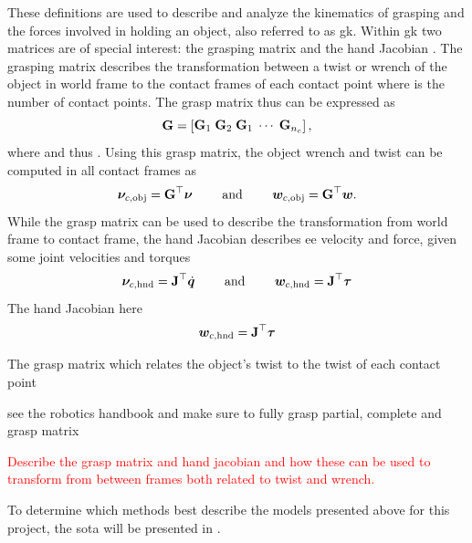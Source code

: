 These definitions are used to describe and analyze the kinematics of grasping and the forces involved in holding an object, also referred to as \gls{gk}. Within \gls{gk} two matrices are of special interest: the grasping matrix  and the hand Jacobian . The grasping matrix describes the transformation between a twist or wrench of the object in world frame  to the contact frames of each contact point  where  is the number of contact points. The grasp matrix thus can be expressed as
\begin{equation}
	\mat{G} = \rvec{ \mat{G}_1 \vsep \mat{G}_2 \vsep \mat{G}_1 \vsep \cdots \vsep \mat{G}_{n_c}},
	\label{eq:grasp-matrix-def}
\end{equation}
where  and thus . Using this grasp matrix, the object wrench and twist can be computed in all contact frames as
%
\begin{equation}
	\bm{\nu}_{c,\text{obj}} =  \bm{\mathrm{G}}^\top \bm{\nu} \qquad \text{ and } \qquad \bm{w}_{c,\text{obj}} =  \bm{\mathrm{G}}^\top \bm{w}.
	\label{eq:grasp-matrix-twist}
\end{equation}
%
While the grasp matrix can be used to describe the transformation from world frame to contact frame, the hand Jacobian describes \gls{ee} velocity and force, given some joint velocities and torques
% 
\begin{equation}
	\bm{\nu}_{c,\text{hnd}} = \bm{\mathrm{J}}^\top \dot{\bm{q}} \qquad \text{ and } \qquad \bm{w}_{c,\text{hnd}} = \bm{\mathrm{J}}^\top \bm{\tau}
	\label{eq:hand-jacobian-velocity}
\end{equation}
%
The hand Jacobian here 
\begin{equation}
	\bm{w}_{c,\text{hnd}} = \bm{\mathrm{J}}^\top \bm{\tau}
	\label{eq:hand-jacobian-force}
\end{equation}

The grasp matrix which relates the object's twist \vec{\nu} to the twist of each contact point

see the robotics handbook and make sure to fully grasp partial, complete and grasp matrix

\textcolor{red}{Describe the grasp matrix and hand jacobian and how these can be used to transform from between frames both related to twist and wrench.}

To determine which methods best describe the models presented above for this project, the \gls{sota} will be presented in .


